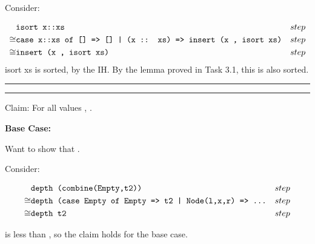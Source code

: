 \documentclass[11pt,letterpaper]{article}
\newcommand{\question}[2] {\vspace{.25in} \hrule\vspace{0.5em}
\noindent{\bf #1: #2} \vspace{0.5em}
\hrule \vspace{.10in}}
\begin{document}
Consider:

\begin{align*}
     & \texttt{isort x::xs} && step \\
\cong & \texttt{case x::xs of [] => [] | (x :: xs) => insert (x , isort xs)} && step \\
\cong & \texttt{insert (x , isort xs)} && step \\
\end{align*}
isort xs is sorted, by the IH.
By the lemma proved in Task 3.1, this is also sorted.

\question{4}{Task 4.4}
Claim: For all values ,
.

{\bf Base Case:}

Want to show that .

Consider:

\begin{align*}
      & \texttt{depth (combine(Empty,t2))} && step \\
\cong & \texttt{depth (case Empty of Empty => t2 | Node(l,x,r) => ...} && step \\
\cong & \texttt{depth t2} && step \\
\end{align*}

 is less than , so the claim holds for the base case.
\end{document}
